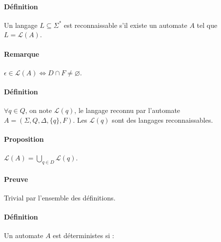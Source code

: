 \paragraph{Définition} %
\label{par:d_finition}

Un langage $L \subseteq \Sigma^*$ est reconnaissable s'il existe un automate $A$ tel que $L=\mathcal{L}(A)$.



\paragraph{Remarque} %
\label{par:remarque}

$\epsilon \in \mathcal{L}(A) \Leftrightarrow D \cap F \not = \varnothing$.



\paragraph{Définition} %
\label{par:d_finition}

$\forall q \in Q$, on note $\mathcal{L}(q)$, le langage reconnu par l'automate $A=(\Sigma,Q,\Delta,\{q\},F)$. Les $\mathcal{L}(q)$ sont des langages reconnaissables.



\paragraph{Proposition} %
\label{par:proposition}

$\mathcal{L}(A) = \bigcup\limits_{q \in D} \mathcal{L}(q)$.



\paragraph{Preuve} %
\label{par:preuve}

Trivial par l'ensemble des définitions.



\paragraph{Définition} %
\label{par:d_finition}

Un automate $A$ est déterministes si :


